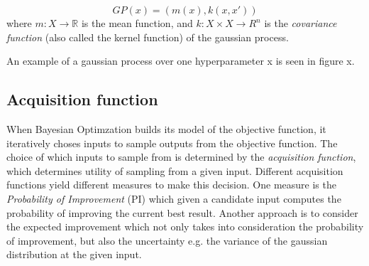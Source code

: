 \begin{equation}\label{gaussian-process}
GP(x) = (m(x), k(x, x'))
\end{equation}
where $m : X \rightarrow \mathbb{R}$ is the mean function, and $k : X \times X \rightarrow R^n$ is the \emph{covariance function} (also called the kernel function) of the gaussian process.

An example of a gaussian process over one hyperparameter x is seen in figure x. 

\subsection{Acquisition function}
When Bayesian Optimzation builds its model of the objective function, it iteratively choses inputs to sample outputs from the objective function. The choice of which inputs to sample from is determined by the \emph{acquisition function}, which determines utility of sampling from a given input. Different acquisition functions yield different measures to make this decision. One measure is the \emph{Probability of Improvement} (PI) which given a candidate input computes the probability of improving the current best result.  Another approach is to consider the expected improvement which not only takes into consideration the  probability of improvement, but also the uncertainty e.g. the variance of the gaussian distribution at the given input.
